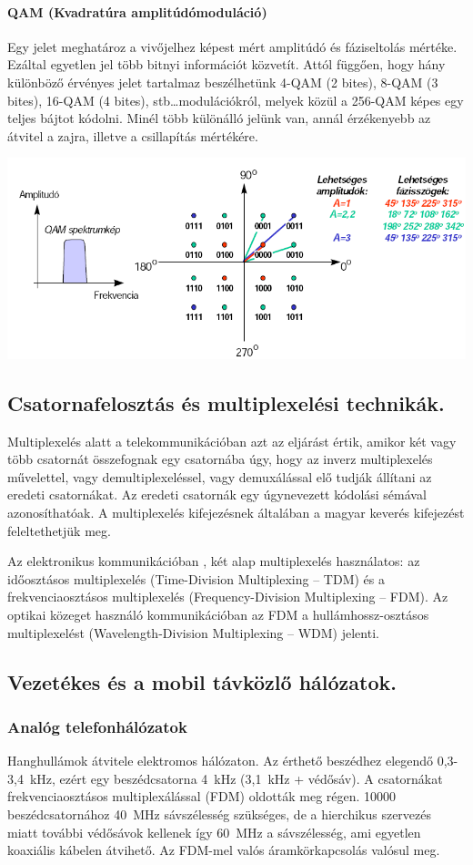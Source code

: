 \paragraph{QAM (Kvadratúra amplitúdómoduláció)}
Egy jelet meghatároz a vivőjelhez képest mért amplitúdó és fáziseltolás mértéke. Ezáltal egyetlen jel több bitnyi információt közvetít. Attól függően, hogy hány különböző érvényes jelet tartalmaz beszélhetünk 4-QAM (2 bites), 8-QAM (3 bites), 16-QAM (4 bites), stb\dots modulációkról, melyek közül a 256-QAM képes egy teljes bájtot kódolni. Minél több különálló jelünk van, annál érzékenyebb az átvitel a zajra, illetve a csillapítás mértékére.
\begin{center}
	\includegraphics[width=0.7\linewidth]{fig/12-QAM}
\end{center}


\subsection{Csatornafelosztás és multiplexelési technikák.}
Multiplexelés alatt a telekommunikációban azt az eljárást értik, amikor két vagy
több csatornát összefognak egy csatornába úgy, hogy az inverz multiplexelés művelettel, vagy demultiplexeléssel, vagy demuxálással elő tudják állítani az eredeti csatornákat. Az eredeti csatornák egy úgynevezett kódolási sémával azonosíthatóak. A multiplexelés kifejezésnek általában a magyar keverés kifejezést feleltethetjük meg. 

Az elektronikus kommunikációban , két alap multiplexelés használatos: az időosztásos multiplexelés (Time-Division Multiplexing -- TDM) és a frekvenciaosztásos multiplexelés (Frequency-Division Multiplexing -- FDM). Az
optikai közeget használó kommunikációban az FDM a hullámhossz-osztásos multiplexelést (Wavelength-Division Multiplexing -- WDM) jelenti.


\subsection{Vezetékes és a mobil távközlő hálózatok.}
\subsubsection{Analóg telefonhálózatok}
Hanghullámok átvitele elektromos hálózaton. Az érthető beszédhez elegendő 0,3-3,4~kHz, ezért egy beszédcsatorna 4~kHz (3,1~kHz + védősáv). A csatornákat frekvenciaosztásos multiplexálással (FDM) oldották meg régen. 10000 beszédcsatornához 40~MHz sávszélesség szükséges, de a hierchikus szervezés miatt további védősávok kellenek így 60~MHz a sávszélesség, ami egyetlen koaxiális kábelen átvihető. Az FDM-mel valós áramkörkapcsolás valósul meg.

